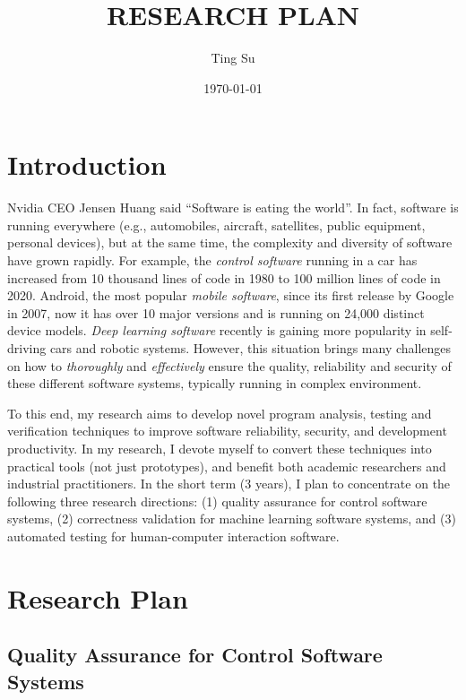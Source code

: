 \documentclass[a4paper]{article}
\title{RESEARCH PLAN}
\author{Ting Su}
\date{\today}
\begin{document}
\fontsize{12}{15}
\selectfont
\maketitle

\section{Introduction}

Nvidia CEO Jensen Huang said ``Software is eating the world''. In fact, software is running everywhere (e.g., automobiles, aircraft, satellites, public equipment, personal devices), but at the same time,
the complexity and diversity of software have grown rapidly.
For example, the \emph{control software} running in a car has increased from 10 thousand lines of code in 1980 to 100 million lines of code in 2020.
Android, the most popular \emph{mobile software}, since its first release by Google in 2007, now it has over 10 major versions and is running on 24,000 distinct  device models. 
\emph{Deep learning software} recently is gaining more popularity in self-driving cars and robotic systems.
However, this situation brings many challenges on how to \emph{thoroughly} and \emph{effectively} ensure the quality, reliability and security of these different software systems, typically running in complex environment.

To this end, my research aims to develop novel program analysis, testing and verification techniques to improve software reliability, security, and development productivity. In my research, I devote myself to convert these techniques into practical tools (not just prototypes), and benefit both academic researchers and industrial practitioners. 
In the short term (3 years), I plan to concentrate on the following three research directions: 
(1) quality assurance for control software systems, (2) correctness validation for machine learning software systems, and (3) automated testing for human-computer interaction software.

\section{Research Plan}

\subsection{Quality Assurance for Control Software Systems}
\end{document}
